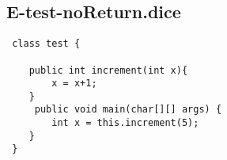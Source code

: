 \subsection{E-test-noReturn.dice}
\begin{verbatim}
 class test {

 	public int increment(int x){
 		x = x+1;
 	}
	 public void main(char[][] args) {
		int x = this.increment(5);
 	}
 }
\end{verbatim}